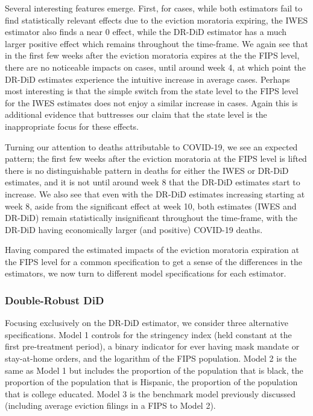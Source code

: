 \documentclass[12pt]{amsart}
\begin{document}
Several interesting features emerge. First, for cases, while both estimators fail to find statistically relevant effects due to the eviction moratoria expiring, the IWES estimator also finds a near 0 effect, while the DR-DiD estimator has a much larger positive effect which remains throughout the time-frame. We again see that in the first few weeks after the eviction moratoria expires at the the FIPS level, there are no noticeable impacts on cases, until around week 4, at which point the DR-DiD estimates experience the intuitive increase in average cases. Perhaps most interesting is that the simple switch from the state level to the FIPS level for the IWES estimates does not enjoy a similar increase in cases. Again this is additional evidence that buttresses our claim that the state level is the inappropriate focus for these effects. 

Turning our attention to deaths attributable to COVID-19, we see an expected pattern; the first few weeks after the eviction moratoria at the FIPS level is lifted there is no distinguishable pattern in deaths for either the IWES or DR-DiD estimates, and it is not until around week 8 that the DR-DiD estimates start to increase. We also see that even with the DR-DiD estimates increasing starting at week 8, aside from the significant effect at week 10, both estimates (IWES and DR-DiD) remain statistically insignificant throughout the time-frame, with the DR-DiD having economically larger (and positive) COVID-19 deaths. 

Having compared the estimated impacts of the eviction moratoria expiration at the FIPS level for a common specification to get a sense of the differences in the estimators, we now turn to different model specifications for each estimator. 

\subsubsection{Double-Robust DiD}

Focusing exclusively on the DR-DiD estimator, we consider three alternative specifications. Model 1 controls for the stringency index (held constant at the first pre-treatment period), a binary indicator for ever having mask mandate or stay-at-home orders, and the logarithm of the FIPS population. Model 2 is the same as Model 1 but includes the proportion of the population that is black, the proportion of the population that is Hispanic, the proportion of the population that is college educated. Model 3 is the benchmark model previously discussed (including average eviction filings in a FIPS to Model 2).  
\end{document}
